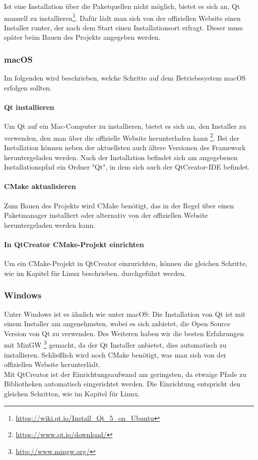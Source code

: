 Ist eine Installation über die Paketquellen nicht möglich, bietet es sich an, Qt manuell
zu installieren\footnote{\url{https://wiki.qt.io/Install_Qt_5_on_Ubuntu}}. Dafür lädt
man sich von der offiziellen Website einen Installer runter, der nach dem Start einen
Installationsort erfragt. Dieser muss später beim Bauen des Projekts angegeben werden.



\subsubsection{macOS}
Im folgenden wird beschrieben, welche Schritte auf dem Betriebssystem macOS erfolgen sollten.
\paragraph{Qt installieren}

Um Qt auf ein Mac-Computer zu installieren, bietet es sich an, den Installer zu
verwenden, den man über die offizielle Website herunterladen kann
\footnote{\url{https://www.qt.io/download/}}. Bei der Installation können neben der
aktuellsten auch ältere Versionen des Framework heruntergeladen werden. Nach
der Installation befindet sich am angegebenen Installationspfad ein Ordner "Qt",
in dem sich auch der QtCreator-IDE befindet.

\paragraph{CMake aktualisieren}

Zum Bauen des Projekts wird CMake benötigt, das in der Regel über einen
Paketmanager installiert oder alternativ von der offiziellen Website
heruntergeladen werden kann.

\paragraph{In QtCreator CMake-Projekt einrichten}

Um ein CMake-Projekt in QtCreator einzurichten, können die gleichen Schritte, wie
im Kapitel für Linux beschrieben, durchgeführt werden.

\subsubsection{Windows}

Unter Windows ist es ähnlich wie unter macOS: Die Installation von Qt ist mit
einem Installer am angenehmsten, wobei es sich anbietet, die Open Source Version
von Qt zu verwenden. Des Weiteren haben wir die besten Erfahrungen mit MinGW
\footnote{\url{http://www.mingw.org/}} gemacht, da der Qt Installer anbietet,
dies automatisch zu installieren. Schließlich wird noch CMake benötigt, was man
sich von der offiziellen Website herunterlädt. \\
Mit QtCreator ist der Einrichtungsaufwand am geringsten, da etwaige Pfade zu
Bibliotheken automatisch eingerichtet werden. Die Einrichtung entspricht den
gleichen Schritten, wie im Kapitel für Linux.

